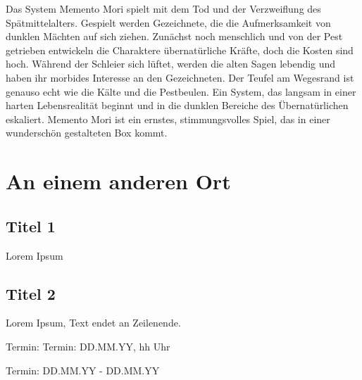 \documentclass[final]{multiversum}
\begin{document}
Das System Memento Mori spielt mit dem Tod und der Verzweiflung des Spätmittelalters.
Gespielt werden Gezeichnete, die die Aufmerksamkeit von dunklen Mächten auf sich ziehen.
Zunächst noch menschlich und von der Pest getrieben entwickeln die Charaktere übernatürliche Kräfte, doch die Kosten sind hoch.
Während der Schleier sich lüftet, werden die alten Sagen lebendig und haben ihr morbides Interesse an den Gezeichneten.
Der Teufel am Wegesrand ist genauso echt wie die Kälte und die Pestbeulen.
Ein System, das langsam in einer harten Lebensrealität beginnt und in die dunklen Bereiche des Übernatürlichen eskaliert.
Memento Mori ist ein ernstes, stimmungsvolles Spiel, das in einer wunderschön gestalteten Box kommt.

\section{An einem anderen Ort}

\subsection{Titel 1}
Lorem Ipsum

\subsection{Titel 2}
Lorem Ipsum, Text endet an Zeilenende.


\begin{termine}
\item Termin: Termin: DD.MM.YY, hh Uhr
  \item Termin: DD.MM.YY - DD.MM.YY
\end{termine}
\impressum
\end{document}
